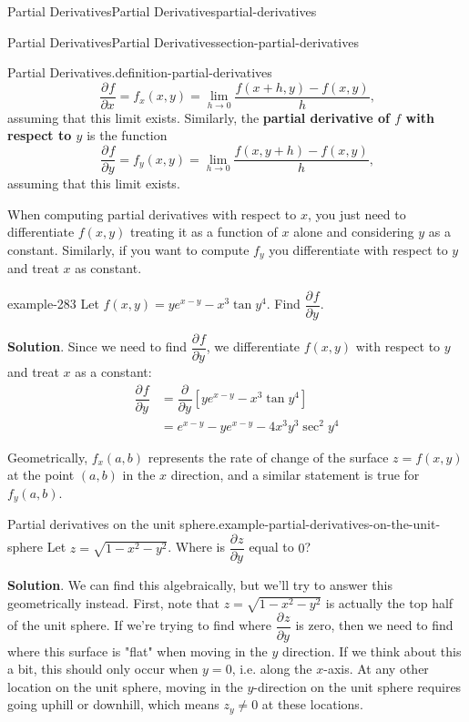 \documentclass[oneside,10pt,]{book}
\newcommand{\terminology}[1]{\textbf{#1}}
\numberwithin{equation}{section}
\newcommand{\pdv}[3][]{\dfrac{\partial^{#1} #2}{\partial #3^{#1}}}
\begin{document}
\begin{chapterptx}{Partial Derivatives}{}{Partial Derivatives}{}{}{partial-derivatives}
\begin{sectionptx}{Partial Derivatives}{}{Partial Derivatives}{}{}{section-partial-derivatives}
\begin{definition}{Partial Derivatives.}{definition-partial-derivatives}
\begin{equation*}
\pdv{f}{x} = f_{x}(x,y) = \lim_{h\to0}\frac{f(x+h,y)-f(x,y)}{h}\text{,}
\end{equation*}
assuming that this limit exists. Similarly, the \terminology{partial derivative of \(f\) with respect to \(y\)} is the function%
\begin{equation*}
\pdv{f}{y} = f_{y}(x,y) = \lim_{h\to0}\frac{f(x,y+h)-f(x,y)}{h}\text{,}
\end{equation*}
assuming that this limit exists.%
\end{definition}
\hypertarget{p-1357}{}%
When computing partial derivatives with respect to \(x\), you just need to differentiate \(f(x,y)\) treating it as a function of \(x\) alone and considering \(y\) as a constant. Similarly, if you want to compute \(f_{y}\) you differentiate with respect to \(y\) and treat \(x\) as constant.%
\begin{example}{}{example-283}%
\hypertarget{p-1358}{}%
Let \(f(x,y) = ye^{x-y} - x^{3}\tan y^{4}\). Find \(\pdv{f}{y}\).%
\par\smallskip%
\noindent\textbf{Solution}.\hypertarget{solution-217}{}\quad%
\hypertarget{p-1359}{}%
Since we need to find \(\pdv{f}{y}\), we differentiate \(f(x,y)\) with respect to \(y\) and treat \(x\) as a constant:%
\begin{align*}
\pdv{f}{y} & = \pdv{}{y}\left[ye^{x-y} - x^{3}\tan y^{4}\right] \\
& = e^{x-y} - ye^{x-y} - 4x^{3}y^{3}\sec^{2}y^{4} 
\end{align*}
%
\end{example}
\hypertarget{p-1360}{}%
Geometrically, \(f_{x}(a,b)\) represents the rate of change of the surface \(z = f(x,y)\) at the point \((a,b)\) in the \(x\) direction, and a similar statement is true for \(f_{y}(a,b)\).%
\begin{example}{Partial derivatives on the unit sphere.}{example-partial-derivatives-on-the-unit-sphere}%
\hypertarget{p-1361}{}%
Let \(z = \sqrt{1-x^{2} - y^{2}}\). Where is \(\pdv{z}{y}\) equal to \(0\)?%
\par\smallskip%
\noindent\textbf{Solution}.\hypertarget{solution-218}{}\quad%
\hypertarget{p-1362}{}%
We can find this algebraically, but we'll try to answer this geometrically instead. First, note that \(z = \sqrt{1 - x^{2} - y^{2}}\) is actually the top half of the unit sphere. If we're trying to find where \(\pdv{z}{y}\) is zero, then we need to find where this surface is "flat" when moving in the \(y\) direction. If we think about this a bit, this should only occur when \(y=0\), i.e. along the \(x\)-axis. At any other location on the unit sphere, moving in the \(y\)-direction on the unit sphere requires going uphill or downhill, which means \(z_{y}\neq0\) at these locations.%

\end{example}
\end{sectionptx}
\end{chapterptx}
\end{document}
